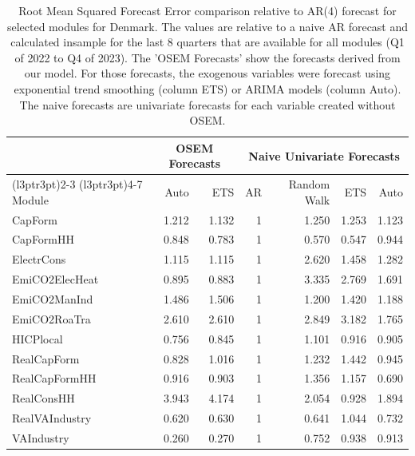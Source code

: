 \begin{table}

\caption{\label{tab:rmsfe_DK}Root Mean Squared Forecast Error comparison relative to AR(4) forecast for selected modules for Denmark. The values are relative to a naive AR forecast and calculated insample for the last 8 quarters that are available for all modules (Q1 of 2022 to Q4 of 2023). The 'OSEM Forecasts' show the forecasts derived from our model. For those forecasts, the exogenous variables were forecast using exponential trend smoothing (column ETS) or ARIMA models (column Auto). The naive forecasts are univariate forecasts for each variable created without OSEM.}
\centering
\begin{tabular}[t]{lrrrrrr}
\toprule
\multicolumn{1}{c}{ } & \multicolumn{2}{c}{OSEM Forecasts} & \multicolumn{4}{c}{Naive Univariate Forecasts} \\
\cmidrule(l{3pt}r{3pt}){2-3} \cmidrule(l{3pt}r{3pt}){4-7}
Module & Auto & ETS & AR & Random Walk & ETS & Auto\\
\midrule
CapForm & 1.212 & 1.132 & 1 & 1.250 & 1.253 & 1.123\\
CapFormHH & 0.848 & 0.783 & 1 & 0.570 & 0.547 & 0.944\\
ElectrCons & 1.115 & 1.115 & 1 & 2.620 & 1.458 & 1.282\\
EmiCO2ElecHeat & 0.895 & 0.883 & 1 & 3.335 & 2.769 & 1.691\\
EmiCO2ManInd & 1.486 & 1.506 & 1 & 1.200 & 1.420 & 1.188\\
\addlinespace
EmiCO2RoaTra & 2.610 & 2.610 & 1 & 2.849 & 3.182 & 1.765\\
HICPlocal & 0.756 & 0.845 & 1 & 1.101 & 0.916 & 0.905\\
RealCapForm & 0.828 & 1.016 & 1 & 1.232 & 1.442 & 0.945\\
RealCapFormHH & 0.916 & 0.903 & 1 & 1.356 & 1.157 & 0.690\\
RealConsHH & 3.943 & 4.174 & 1 & 2.054 & 0.928 & 1.894\\
\addlinespace
RealVAIndustry & 0.620 & 0.630 & 1 & 0.641 & 1.044 & 0.732\\
VAIndustry & 0.260 & 0.270 & 1 & 0.752 & 0.938 & 0.913\\
\bottomrule
\end{tabular}
\end{table}
